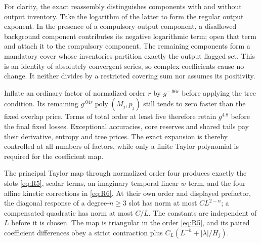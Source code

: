 For clarity, the exact reassembly distinguishes components with and
without output inventory.  Take the logarithm of the latter to form the
regular output exponent.  In the presence of a compulsory output
component, a disallowed background component contributes its negative
logarithmic term; open that term and attach it to the compulsory
component.  The remaining components form a mandatory cover whose
inventories partition exactly the output flagged set.  This is an
identity of absolutely convergent series, so complex coefficients cause
no change.  It neither divides by a restricted covering sum nor assumes
its positivity.

Inflate an ordinary factor of normalized order $r$ by $g^{-.96r}$
before applying the tree condition.  Its remaining
$g^{.04r}\operatorname{poly}(M_j,p_j)$ still tends to zero faster than
the fixed overlap price.  Terms of total order at least five therefore
retain $g^{4.8}$ before the final fixed losses.  Exceptional accuracies,
core reserves and shared tails pay their derivative, entropy and tree
prices.  The exact expansion is thereby controlled at all numbers of
factors, while only a finite Taylor polynomial is required for the
coefficient map.

\begin{lemma}\label{lem:rg-canonical}
The principal Taylor map through normalized order four produces exactly
the slots \eqref{eq:R5}, scalar terms, an imaginary temporal linear
$w$ term, and the four affine kinetic corrections in \eqref{eq:R6}.
At their own order and displayed prefactor, the diagonal response of a
degree-$n\ge3$ slot has norm at most $CL^{2-n}$; a compensated quadratic
has norm at most $C/L$.  The constants are independent of $L$ before
it is chosen.  The map is triangular in the order \eqref{eq:R5}, and
its paired coefficient differences obey a strict contraction plus
$C_L(L^{-h}+|\lambda|/H_j)$.
\end{lemma}

